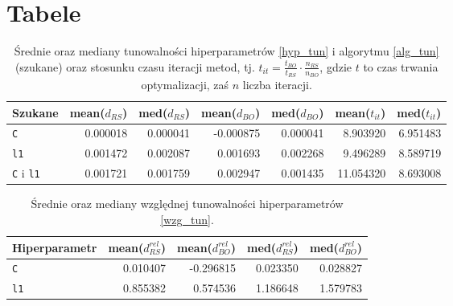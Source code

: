 \documentclass[a4paper,11pt]{article}
\begin{document}
\section*{Tabele}
\begin{table}[H]
    \centering
    \begin{tabular}{|l|r|r|r|r|r|r|}
    \hline
    Szukane & mean($d_{RS}$) & med($d_{RS}$) & mean($d_{BO}$) & med($d_{BO}$) & mean($t_{it}$) & med($t_{it}$) \\ \hline
    \texttt{C} & 0.000018 & 0.000041 & -0.000875 & 0.000041 & 8.903920 & 6.951483 \\ \hline
    \texttt{l1} & 0.001472 & 0.002087 & 0.001693 & 0.002268 & 9.496289 & 8.589719 \\ \hline
    \texttt{C} i \texttt{l1} & 0.001721 & 0.001759 & 0.002947 & 0.001435 & 11.054320 & 8.693008 \\ \hline
    \end{tabular}
    \vspace{2ex}
    \caption{Średnie oraz mediany tunowalności hiperparametrów \eqref{hyp_tun} i algorytmu \eqref{alg_tun} (szukane) oraz stosunku czasu iteracji metod, tj. $t_{it} = \frac{t_{BO}}{t_{RS}} \cdot \frac{n_{RS}}{n_{BO}}$, gdzie $t$ to czas trwania optymalizacji, zaś $n$ liczba iteracji.}
    \label{tab:elnet:wyn}
\end{table}

\begin{table}[H]
    \centering
    \begin{tabular}{|l|r|r|r|r|}
    \hline
    Hiperparametr & mean($d^{rel}_{RS}$) & mean($d^{rel}_{BO}$) & med($d^{rel}_{RS}$) & med($d^{rel}_{BO}$) \\ \hline
    \texttt{C} & 0.010407 & -0.296815 & 0.023350 & 0.028827 \\ \hline
    \texttt{l1} & 0.855382 &  0.574536 & 1.186648 & 1.579783 \\ \hline
    \end{tabular}
    \vspace{2ex}
    \caption{Średnie oraz mediany względnej tunowalności hiperparametrów \eqref{wzg_tun}.}
    \label{tab:elnet:rel}
\end{table}
\end{document}
